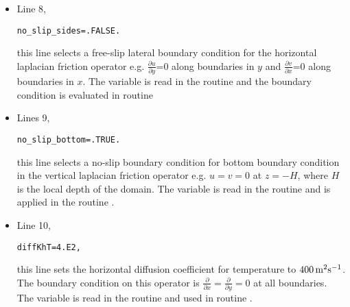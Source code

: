 \begin{itemize}
\item Line 8,
\begin{verbatim}
no_slip_sides=.FALSE.
\end{verbatim}
  this line selects a free-slip lateral boundary condition for the
  horizontal laplacian friction operator e.g. $\frac{\partial
    u}{\partial y}$=0 along boundaries in $y$ and $\frac{\partial
    v}{\partial x}$=0 along boundaries in $x$.  The variable
   is read in the routine
   and the boundary condition is
  evaluated in routine

  
\item Lines 9,
\begin{verbatim}
no_slip_bottom=.TRUE.
\end{verbatim}
  this line selects a no-slip boundary condition for bottom boundary
  condition in the vertical laplacian friction operator e.g. $u=v=0$
  at $z=-H$, where $H$ is the local depth of the domain.  The variable
   is read in the routine
   and is applied in the
  routine .


\item Line 10,
\begin{verbatim}
diffKhT=4.E2,
\end{verbatim}
  this line sets the horizontal diffusion coefficient for temperature
  to $400\,{\rm m^{2}s^{-1}}$. The boundary condition on this operator
  is $\frac{\partial}{\partial x}=\frac{\partial}{\partial y}=0$ at
  all boundaries.  The variable  is read in
  the routine  and used in routine
  .



\end{itemize}
